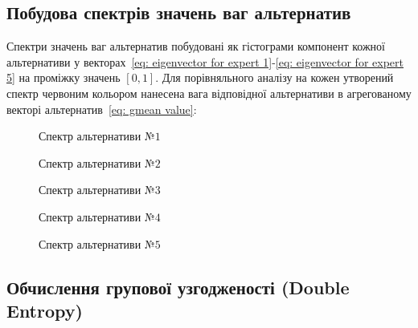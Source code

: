 \documentclass{mathreport}
\begin{document}
\subsection{Побудова спектрів значень ваг альтернатив}

Спектри значень ваг альтернатив побудовані як гістограми компонент кожної альтернативи у векторах~\eqref{eq: eigenvector for expert 1}-\eqref{eq: eigenvector for expert 5} на проміжку значень $[0,1]$. Для порівняльного аналізу на кожен утворений спектр червоним кольором нанесена вага відповідної альтернативи в агрегованому векторі альтернатив~\eqref{eq: gmean value}:

\begin{figure}[H]\centering
    
    \caption{Спектр альтернативи №$1$}
    \label{pic: alternative 1 spectrum}
\end{figure}

\begin{figure}[H]\centering
    
    \caption{Спектр альтернативи №$2$}
    \label{pic: alternative 2 spectrum}
\end{figure}

\begin{figure}[H]\centering
    
    \caption{Спектр альтернативи №$3$}
    \label{pic: alternative 3 spectrum}
\end{figure}

\begin{figure}[H]\centering
    
    \caption{Спектр альтернативи №$4$}
    \label{pic: alternative 4 spectrum}
\end{figure}

\begin{figure}[H]\centering
    
    \caption{Спектр альтернативи №$5$}
    \label{pic: alternative 5 spectrum}
\end{figure}

\subsection{Обчислення групової узгодженості (Double Entropy)}
\end{document}
